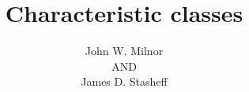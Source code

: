 \frontmatter
	
	\title{Characteristic classes}
	
	
	
	
	\author{John W. Milnor\\AND\\  James D. Stasheff}
	
	\thispagestyle{empty}
	
	\cleardoublepage
	\makepuptitle